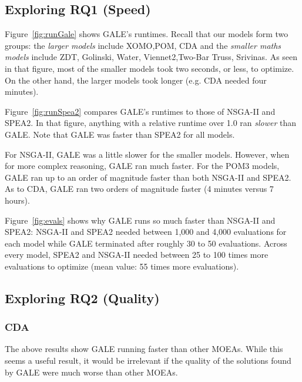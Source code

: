 \documentclass[10pt,journal,compsoc]{IEEEtran}
\newcommand{\fig}[1]{Figure~\ref{fig:#1}}
\begin{document}
\subsection{Exploring RQ1 (Speed)}

\fig{runGale} shows GALE's runtimes.
Recall that our models form two groups:
the {\em larger models} include XOMO,POM, CDA
and the {\em smaller maths models} include  ZDT, Golinski, Water, Viennet2,Two-Bar Truss, Srivinas.
As seen in that figure,
most of the smaller models took two seconds, or less,  to optimize.
On the other hand, the larger models took longer (e.g. CDA needed four minutes).









\fig{runSpea2} compares GALE's runtimes to those
of NSGA-II and SPEA2. In that figure, anything with a relative
runtime over 1.0 ran {\em slower} than GALE. Note that 
GALE was faster than SPEA2 for all models. 

For NSGA-II, GALE was a little slower for the smaller models.
However, when for more complex reasoning, GALE ran much faster. 
For the POM3 models, GALE ran up to an order of magnitude faster than both NSGA-II and SPEA2.
As to CDA, GALE ran two orders of magnitude faster (4 minutes versus 7 hours).



\fig{evals}  shows why GALE  runs so much faster than NSGA-II and SPEA2:
NSGA-II and SPEA2 needed between 1,000 and 4,000 evaluations for each model while GALE terminated after roughly 30 to 50 evaluations.
Across every model, SPEA2 and NSGA-II needed between 25 to 100 times more
evaluations to optimize (mean value: 55 times more evaluations).



\subsection{Exploring RQ2 (Quality)}


\subsubsection{CDA}

The above results show GALE running faster than other MOEAs.
While this seems a useful result, it would be irrelevant if
the quality of the solutions found by GALE were much worse than other MOEAs.
\end{document}
